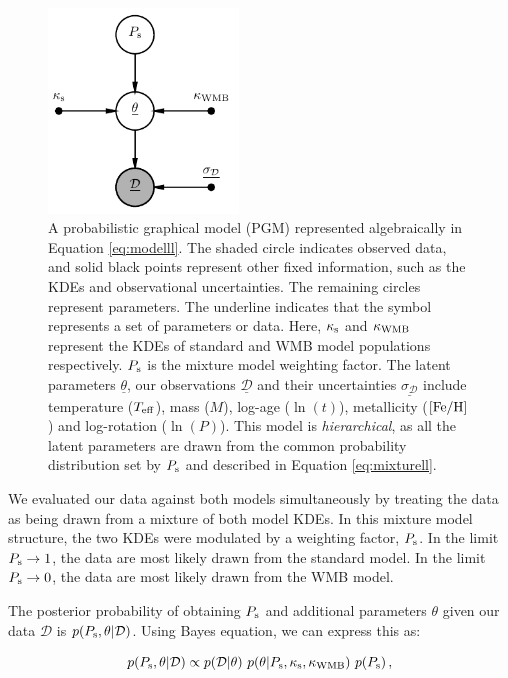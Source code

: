\documentclass[12pt]{article}
\newcommand{\teff}{\mbox{$T_{\rm eff}$}\xspace}
\newcommand{\feh}{\mbox{$\rm{[Fe/H]}$}\xspace}
\begin{document}
\begin{figure}
	\centering
	\includegraphics[width=0.45\textwidth]{pgm_models.pdf}
	\caption{A probabilistic graphical model (PGM) represented algebraically in Equation \ref{eq:modelll}. The shaded circle indicates observed data, and solid black points represent other fixed information, such as the KDEs and observational uncertainties. The remaining circles represent parameters. The underline indicates that the symbol represents a set of parameters or data. Here, $\kappa_{\rm{s}}$ and $\kappa_{\rm WMB}$ represent the KDEs of standard and WMB model populations respectively. $P_{\rm{s}}$ is the mixture model weighting factor. The latent parameters $\underline{\theta}$, our observations $\underline{\mathcal{D}}$ and their uncertainties $\underline{\sigma_{\mathcal{D}}}$ include temperature (\teff), mass ($M$), log-age ($\ln(t)$), metallicity (\feh) and log-rotation ($\ln(P)$). This model is \textit{hierarchical}, as all the latent parameters are drawn from the common probability distribution set by $P_{\rm{s}}$ and described in Equation \ref{eq:mixturell}.}
	\label{fig:pgm}
\end{figure}

We evaluated our data against both models simultaneously by treating the data as being drawn from a mixture of both model KDEs. In this mixture model structure, the two KDEs were modulated by a weighting factor, $P_{\rm s}$. In the limit $P_{\rm s} \rightarrow 1$, the data are most likely drawn from the standard model. In the limit $P_{\rm s} \rightarrow 0$, the data are most likely drawn from the WMB model.

The posterior probability of obtaining $P_{\rm s}$ and additional parameters $\theta$ given our data $\mathcal{D}$ is $p(P_{\rm{s}}, \theta | \mathcal{D})$. Using Bayes equation, we can express this as:

\begin{equation}\label{eq:modelll}
	p(P_{\rm{s}}, \theta | \mathcal{D}) \propto p(\mathcal{D} | \theta)\ p(\theta | P_{\rm{s}}, \kappa_{\rm{s}}, \kappa_{\rm{WMB}})\ p(P_{\rm{s}})\, ,
\end{equation}
\end{document}
